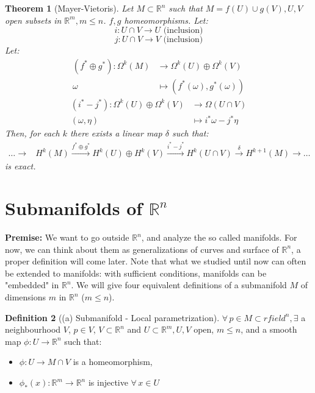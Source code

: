 \documentclass[a4paper,11pt,titlepage]{article}
\numberwithin{equation}{section}
\newtheorem{theorem}{Theorem}[section]
\theoremstyle{definition}
\newtheorem{definition}[theorem]{Definition}
\theoremstyle{remark}
\newcommand{\rfield}{\mathbb{R}}
\begin{document}
\begin{theorem}[Mayer-Vietoris]
  Let $M \subset \rfield^n$ such that $M=f(U) \cup g(V), U, V$ open subsets in $\rfield^m, m \le n$. $f, g$ homeomorphisms.
  Let:
  $$i \colon U \cap V \rightarrow U \text{ (inclusion)}$$
  $$j \colon U \cap V \rightarrow V \text{ (inclusion)}$$
  Let:
  \begin{align*}
    (f^* \oplus g^*) \colon \Omega^k(M) &\rightarrow \Omega^k(U) \oplus \Omega^k(V) \\
    \omega &\mapsto (f^*(\omega), g^*(\omega))
  \end{align*}
  \begin{align*}
    (i^* - j^*) \colon \Omega^k(U) \oplus \Omega^k(V) &\rightarrow \Omega(U \cap V)\\
    (\omega, \eta) &\mapsto i^* \omega - j^* \eta
  \end{align*}
  Then, for each $k$ there exists a linear map $\delta$ such that:
  \begin{align*}
    \ldots \longrightarrow &H^k(M) \overset{f^* \oplus g^*}{\longrightarrow} H^k(U) \oplus H^k(V) \overset{i^* - j^*}{\longrightarrow} H^k(U \cap V) \overset{\delta}{\longrightarrow} H^{k+1}(M) \longrightarrow \ldots
  \end{align*}
  is exact.
\end{theorem}
\newpage

\section{Submanifolds of $\rfield^n$}
\textbf{Premise:} We want to go outside $\rfield^n$, and analyze the so called manifolds. For now, we can think about them as generalizations of curves and surface of $\rfield^n$, a proper definition will come later. Note that what we studied until now can often be extended to manifolds: with sufficient conditions, manifolds can be "embedded" in $\rfield^n$.
We will give four equivalent definitions of a submanifold $M$ of dimensions $m$ in $\rfield^n$ ($m \le n$).
\begin{definition}[(a) Submanifold - Local parametrization]
  $\forall \, p \in M \subset rfield^n, \exists$ a neighbourhood $V$, $p \in V$, $V \subset \rfield^n$ and $U \subset \rfield^m, U, V$ open, $m \le n$, and a smooth map $\phi \colon U \rightarrow \rfield^n$ such that:
  \begin{itemize}
    \item $\phi \colon U \rightarrow M \cap V$ is a homeomorphism,
    \item $\phi_* (x) \colon \rfield^m \rightarrow \rfield^n$ is injective $\forall \, x \in U$
  \end{itemize}
\end{definition}
\end{document}
